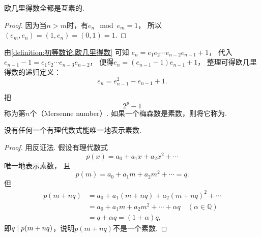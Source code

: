 \begin{proposition}
欧几里得数全都是互素的.
\begin{proof}
因为当\(n > m\)时，有\(e_n \mod e_m = 1\)，
所以\((e_m,e_n)
= (1,e_n)
= (0,1)
= 1\).
\end{proof}
\end{proposition}

由\cref{definition:初等数论.欧几里得数} 可知
\(e_n = e_1 e_2 \dotsm e_{n-2} e_{n-1} + 1\)，
代入\(e_{n-1} - 1 = e_1 e_2 \dotsm e_{n-3} e_{n-2}\)，
便得\(e_n = (e_{n-1} - 1) e_{n-1} + 1\)，
整理可得欧几里得数的递归定义：\begin{equation}
	e_n = e_{n-1}^2 - e_{n-1} + 1.
\end{equation}

\begin{definition}
把\begin{equation*}
	2^p - 1
\end{equation*}称为第\(n\)个（Mersenne number）.
如果一个梅森数是素数，则将它称为.
\end{definition}

\begin{theorem}
没有任何一个有理代数式能唯一地表示素数.
\begin{proof}
用反证法.
假设有理代数式\begin{equation*}
	p(x) = a_0 + a_1 x + a_2 x^2 + \dotsb
\end{equation*}唯一地表示素数，
且\begin{equation*}
	p(m) = a_0 + a_1 m + a_2 m^2 + \dotsb = q.
\end{equation*}
但\begin{align*}
	p(m+nq) &= a_0 + a_1 (m+nq) + a_2 (m+nq)^2 + \dotsb \\
	&= a_0 + a_1 m + a_2 m^2 + \dotsb + \alpha q \quad(\alpha\in\mathbb{Q}) \\
	&= q + \alpha q = (1+\alpha)q,
\end{align*}
即\(\ExactlyDividedBy{p(m+nq)}{q}\)，说明\(p(m+nq)\)不是一个素数.
\end{proof}
\end{theorem}

